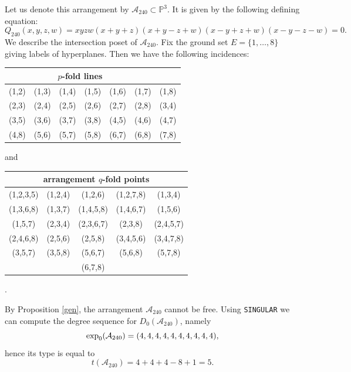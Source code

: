 \documentclass[11pt]{article}
\theoremstyle{plain}
\theoremstyle{definition}
\begin{document}
\noindent
{}
\vskip 5pt
\noindent
Let us denote this arrangement by $\mathcal{A}_{240} \subset \mathbb{P}^{3}$. It is given by the following defining equation:
$$Q_{240}(x,y,z,w) = xyzw(x+y+z)(x+y-z+w)(x-y+z+w)(x-y-z-w)=0.$$
We describe the intersection poset of $\mathcal{A}_{240}$. Fix the ground set $E= \{1, \ldots , 8\}$ giving labels of hyperplanes. Then we have the following incidences:
\begin{center}
\begin{tabular}{ c c c c c c c }
\multicolumn{6}{c}{$p$-fold lines} \\\hline \hline
 (1,2) &  (1,3) &  (1,4) &  (1,5) &  (1,6) &  (1,7) &  (1,8)\\
 (2,3) &  (2,4) &  (2,5) &  (2,6) &  (2,7) &  (2,8) &  (3,4)\\
 (3,5) &  (3,6) & (3,7) & (3,8) & (4,5) &  (4,6) &  (4,7)\\
 (4,8) &  (5,6) &  (5,7) &  (5,8) & (6,7) &  (6,8) &  (7,8)
\end{tabular}
\end{center}
and 
\begin{center}
\begin{tabular}{ c c c c c }
\multicolumn{5}{c}{arrangement $q$-fold points} \\ \hline \hline 
(1,2,3,5) &  (1,2,4) &  (1,2,6) &  (1,2,7,8) 
&  (1,3,4) \\
(1,3,6,8) &  (1,3,7) &  (1,4,5,8) &  (1,4,6,7) &  (1,5,6) \\
(1,5,7) &  (2,3,4) & (2,3,6,7) & (2,3,8) &  (2,4,5,7) \\
(2,4,6,8) &  (2,5,6) &  (2,5,8) &  (3,4,5,6) &  (3,4,7,8) \\
(3,5,7) & (3,5,8) & (5,6,7) & (5,6,8) &  (5,7,8)\\
& & (6,7,8) & &
\end{tabular}.
\end{center}
By Proposition \ref{gen}, the arrangement $\mathcal{A}_{240}$ cannot be free. Using \texttt{SINGULAR} we can compute the degree sequence for $D_{0}(\mathcal{A}_{240})$, namely
$${\rm exp}_{0}(\mathcal{A}_{240}) = (4,4,4,4,4,4,4,4,4,4),$$
hence its type is equal to
$$t(\mathcal{A}_{240})= 4 + 4 + 4 - 8+1 = 5.$$
\end{document}
